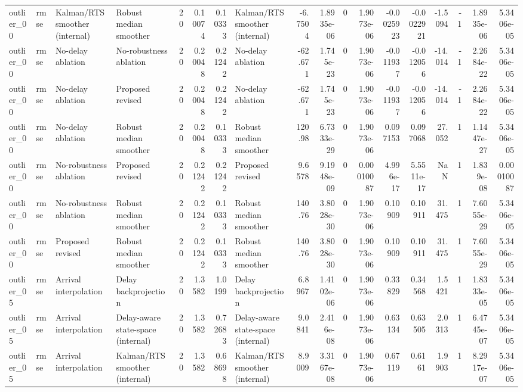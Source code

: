 \begin{table}[!htbp]
{\begin{tabular}{llllrrrlrrrrrrrrrr}
outlier_00 & rmse & Kalman/RTS smoother (internal) & Robust median smoother & 20 & 0.10074 & 0.10333 & Kalman/RTS smoother (internal) & -6.7504 & 1.8935e-06 & 0 & 1.9073e-06 & -0.0025923 & -0.0022921 & -1.5094 & -1 & 1.8935e-06 & 5.3406e-05 \\
outlier_00 & rmse & No-delay ablation & No-robustness ablation & 20 & 0.20048 & 0.21242 & No-delay ablation & -62.671 & 1.745e-23 & 0 & 1.9073e-06 & -0.011937 & -0.012056 & -14.014 & -1 & 2.2684e-22 & 5.3406e-05 \\
outlier_00 & rmse & No-delay ablation & Proposed revised & 20 & 0.20048 & 0.21242 & No-delay ablation & -62.671 & 1.745e-23 & 0 & 1.9073e-06 & -0.011937 & -0.012056 & -14.014 & -1 & 2.2684e-22 & 5.3406e-05 \\
outlier_00 & rmse & No-delay ablation & Robust median smoother & 20 & 0.20048 & 0.10333 & Robust median smoother & 120.98 & 6.7333e-29 & 0 & 1.9073e-06 & 0.097153 & 0.097068 & 27.052 & 1 & 1.1447e-27 & 5.3406e-05 \\
outlier_00 & rmse & No-robustness ablation & Proposed revised & 20 & 0.21242 & 0.21242 & Proposed revised & 9.6578 & 9.1948e-09 & 0 & 0.00010087 & 4.996e-17 & 5.5511e-17 & NaN & 1 & 1.839e-08 & 0.00010087 \\
outlier_00 & rmse & No-robustness ablation & Robust median smoother & 20 & 0.21242 & 0.10333 & Robust median smoother & 140.76 & 3.8028e-30 & 0 & 1.9073e-06 & 0.10909 & 0.10911 & 31.475 & 1 & 7.6055e-29 & 5.3406e-05 \\
outlier_00 & rmse & Proposed revised & Robust median smoother & 20 & 0.21242 & 0.10333 & Robust median smoother & 140.76 & 3.8028e-30 & 0 & 1.9073e-06 & 0.10909 & 0.10911 & 31.475 & 1 & 7.6055e-29 & 5.3406e-05 \\
outlier_05 & rmse & Arrival interpolation & Delay backprojection & 20 & 1.3582 & 1.0199 & Delay backprojection & 6.8967 & 1.4102e-06 & 0 & 1.9073e-06 & 0.33829 & 0.34568 & 1.5421 & 1 & 1.8333e-05 & 5.3406e-05 \\
outlier_05 & rmse & Arrival interpolation & Delay-aware state-space (internal) & 20 & 1.3582 & 0.72683 & Delay-aware state-space (internal) & 9.0841 & 2.416e-08 & 0 & 1.9073e-06 & 0.63134 & 0.63505 & 2.0313 & 1 & 6.4745e-07 & 5.3406e-05 \\
outlier_05 & rmse & Arrival interpolation & Kalman/RTS smoother (internal) & 20 & 1.3582 & 0.68698 & Kalman/RTS smoother (internal) & 8.9009 & 3.3167e-08 & 0 & 1.9073e-06 & 0.67119 & 0.6161 & 1.9903 & 1 & 8.2917e-07 & 5.3406e-05 \\

\end{tabular}}
\end{table}
